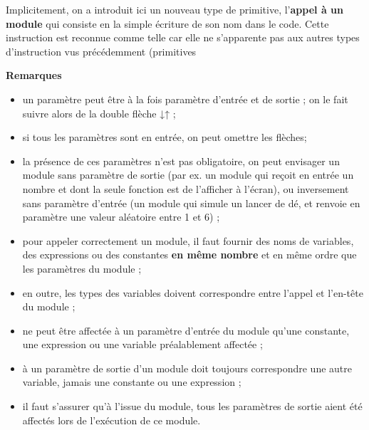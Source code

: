 {
{Implicitement, on a introduit ici un nouveau
type de primitive, l’}{\textbf{appel à un
}}{\textbf{module}}{\textit{
}}{qui consiste en la simple écriture de son
nom dans le code. Cette }{instruction est
reconnue comme telle car elle ne s’apparente pas aux autres types
}{d’instruction vus précédemment (primitives
}}

{\bfseries
Remarques}

\liststyleListv
\begin{itemize}
\item {
{un paramètre peut être à la fois paramètre
d’entrée et de sortie ; on le fait suivre alors de la double flèche
}{↓↑}{ ;}}
\item {
si tous les paramètres sont en entrée, on peut omettre les flèches;}
\item {
la présence de ces paramètres n’est pas obligatoire, on peut envisager
un module sans paramètre de sortie (par ex. un module qui reçoit en
entrée un nombre et dont la seule fonction est de l’afficher à
l’écran), ou inversement sans paramètre d’entrée (un module qui simule
un lancer de dé, et renvoie en paramètre une valeur aléatoire entre 1
et 6) ;}
\item {
{pour appeler correctement un module, il faut
fournir des noms de variables, des expressions ou des constantes
}{\textbf{en même
nombre}}{ et en même ordre que les paramètres
du module ;}}
\item {
en outre, les types des variables doivent correspondre entre l’appel et
l’en-tête du module ;}
\item {
ne peut être affectée à un paramètre d’entrée du module qu’une
constante, une expression ou une variable préalablement affectée ;}
\item {
à un paramètre de sortie d’un module doit toujours correspondre une
autre variable, jamais une constante ou une expression ;}
\item {
il faut s’assurer qu’à l’issue du module, tous les paramètres de sortie
aient été affectés lors de l’exécution de ce module.}
\end{itemize}
